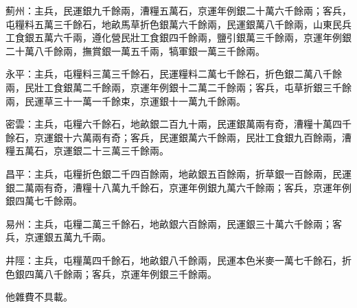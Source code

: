 薊州：主兵，民運銀九千餘兩，漕糧五萬石，京運年例銀二十萬六千餘兩；客兵，屯糧料五萬三千餘石，地畝馬草折色銀萬六千餘兩，民運銀萬八千餘兩，山東民兵工食銀五萬六千兩，遵化營民壯工食銀四千餘兩，鹽引銀萬三千餘兩，京運年例銀二十萬八千餘兩，撫賞銀一萬五千兩，犒軍銀一萬三千餘兩。

永平：主兵，屯糧料三萬三千餘石，民運糧料二萬七千餘石，折色銀二萬八千餘兩，民壯工食銀萬二千餘兩，京運年例銀十二萬二千餘兩；客兵，屯草折銀三千餘兩，民運草三十一萬一千餘束，京運銀十一萬九千餘兩。

密雲：主兵，屯糧六千餘石，地畝銀二百九十兩，民運銀萬兩有奇，漕糧十萬四千餘石，京運銀十六萬兩有奇；客兵，民運銀萬六千餘兩，民壯工食銀九百餘兩，漕糧五萬石，京運銀二十三萬三千餘兩。

昌平：主兵，屯糧折色銀二千四百餘兩，地畝銀五百餘兩，折草銀一百餘兩，民運銀二萬兩有奇，漕糧十八萬九千餘石，京運年例銀九萬六千餘兩；客兵，京運年例銀四萬七千餘兩。

易州：主兵，屯糧二萬三千餘石，地畝銀六百餘兩，民運銀三十萬六千餘兩；客兵，京運銀五萬九千兩。

井陘：主兵，屯糧萬四千餘石，地畝銀八千餘兩，民運本色米麥一萬七千餘石，折色銀四萬八千餘兩；客兵，京運年例銀三千餘兩。

他雜費不具載。

